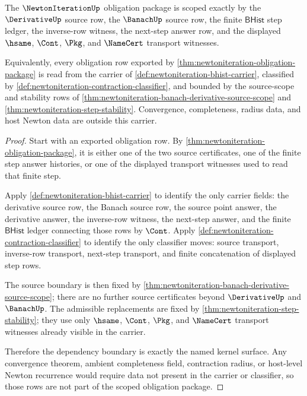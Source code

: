 \begin{theorem}
\label{thm:newtoniteration-scoped-kernel-dependency-boundary}
The $\NewtonIterationUp$ obligation package is scoped exactly by the $\DerivativeUp$ source row, the $\BanachUp$ source row, the finite $\mathsf{BHist}$ step ledger, the inverse-row witness, the next-step answer row, and the displayed $\hsame$, $\Cont$, $\Pkg$, and $\NameCert$ transport witnesses.

Equivalently, every obligation row exported by \autoref{thm:newtoniteration-obligation-package} is read from the carrier of \autoref{def:newtoniteration-bhist-carrier}, classified by \autoref{def:newtoniteration-contraction-classifier}, and bounded by the source-scope and stability rows of \autoref{thm:newtoniteration-banach-derivative-source-scope} and \autoref{thm:newtoniteration-step-stability}. Convergence, completeness, radius data, and host Newton data are outside this carrier.
\end{theorem}
\begin{proof}
Start with an exported obligation row. By \autoref{thm:newtoniteration-obligation-package}, it is either one of the two source certificates, one of the finite step answer histories, or one of the displayed transport witnesses used to read that finite step.

Apply \autoref{def:newtoniteration-bhist-carrier} to identify the only carrier fields: the derivative source row, the Banach source row, the source point answer, the derivative answer, the inverse-row witness, the next-step answer, and the finite $\mathsf{BHist}$ ledger connecting those rows by $\Cont$. Apply \autoref{def:newtoniteration-contraction-classifier} to identify the only classifier moves: source transport, inverse-row transport, next-step transport, and finite concatenation of displayed step rows.

The source boundary is then fixed by \autoref{thm:newtoniteration-banach-derivative-source-scope}; there are no further source certificates beyond $\DerivativeUp$ and $\BanachUp$. The admissible replacements are fixed by \autoref{thm:newtoniteration-step-stability}; they use only $\hsame$, $\Cont$, $\Pkg$, and $\NameCert$ transport witnesses already visible in the carrier.

Therefore the dependency boundary is exactly the named kernel surface. Any convergence theorem, ambient completeness field, contraction radius, or host-level Newton recurrence would require data not present in the carrier or classifier, so those rows are not part of the scoped obligation package.
\end{proof}

